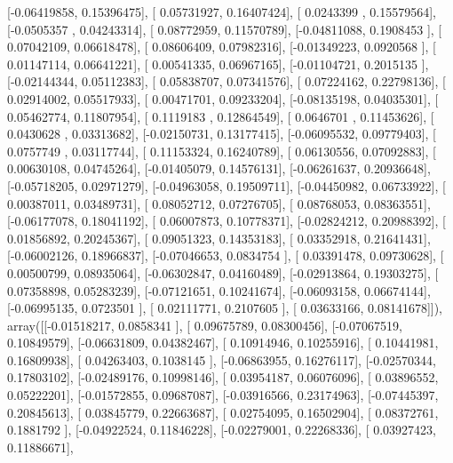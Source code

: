 \documentclass{article}
\begin{document}
       [-0.06419858,  0.15396475],
       [ 0.05731927,  0.16407424],
       [ 0.0243399 ,  0.15579564],
       [-0.0505357 ,  0.04243314],
       [ 0.08772959,  0.11570789],
       [-0.04811088,  0.1908453 ],
       [ 0.07042109,  0.06618478],
       [ 0.08606409,  0.07982316],
       [-0.01349223,  0.0920568 ],
       [ 0.01147114,  0.06641221],
       [ 0.00541335,  0.06967165],
       [-0.01104721,  0.2015135 ],
       [-0.02144344,  0.05112383],
       [ 0.05838707,  0.07341576],
       [ 0.07224162,  0.22798136],
       [ 0.02914002,  0.05517933],
       [ 0.00471701,  0.09233204],
       [-0.08135198,  0.04035301],
       [ 0.05462774,  0.11807954],
       [ 0.1119183 ,  0.12864549],
       [ 0.0646701 ,  0.11453626],
       [ 0.0430628 ,  0.03313682],
       [-0.02150731,  0.13177415],
       [-0.06095532,  0.09779403],
       [ 0.0757749 ,  0.03117744],
       [ 0.11153324,  0.16240789],
       [ 0.06130556,  0.07092883],
       [ 0.00630108,  0.04745264],
       [-0.01405079,  0.14576131],
       [-0.06261637,  0.20936648],
       [-0.05718205,  0.02971279],
       [-0.04963058,  0.19509711],
       [-0.04450982,  0.06733922],
       [ 0.00387011,  0.03489731],
       [ 0.08052712,  0.07276705],
       [ 0.08768053,  0.08363551],
       [-0.06177078,  0.18041192],
       [ 0.06007873,  0.10778371],
       [-0.02824212,  0.20988392],
       [ 0.01856892,  0.20245367],
       [ 0.09051323,  0.14353183],
       [ 0.03352918,  0.21641431],
       [-0.06002126,  0.18966837],
       [-0.07046653,  0.0834754 ],
       [ 0.03391478,  0.09730628],
       [ 0.00500799,  0.08935064],
       [-0.06302847,  0.04160489],
       [-0.02913864,  0.19303275],
       [ 0.07358898,  0.05283239],
       [-0.07121651,  0.10241674],
       [-0.06093158,  0.06674144],
       [-0.06995135,  0.0723501 ],
       [ 0.02111771,  0.2107605 ],
       [ 0.03633166,  0.08141678]]), array([[-0.01518217,  0.0858341 ],
       [ 0.09675789,  0.08300456],
       [-0.07067519,  0.10849579],
       [-0.06631809,  0.04382467],
       [ 0.10914946,  0.10255916],
       [ 0.10441981,  0.16809938],
       [ 0.04263403,  0.1038145 ],
       [-0.06863955,  0.16276117],
       [-0.02570344,  0.17803102],
       [-0.02489176,  0.10998146],
       [ 0.03954187,  0.06076096],
       [ 0.03896552,  0.05222201],
       [-0.01572855,  0.09687087],
       [-0.03916566,  0.23174963],
       [-0.07445397,  0.20845613],
       [ 0.03845779,  0.22663687],
       [ 0.02754095,  0.16502904],
       [ 0.08372761,  0.1881792 ],
       [-0.04922524,  0.11846228],
       [-0.02279001,  0.22268336],
       [ 0.03927423,  0.11886671],
\end{document}
